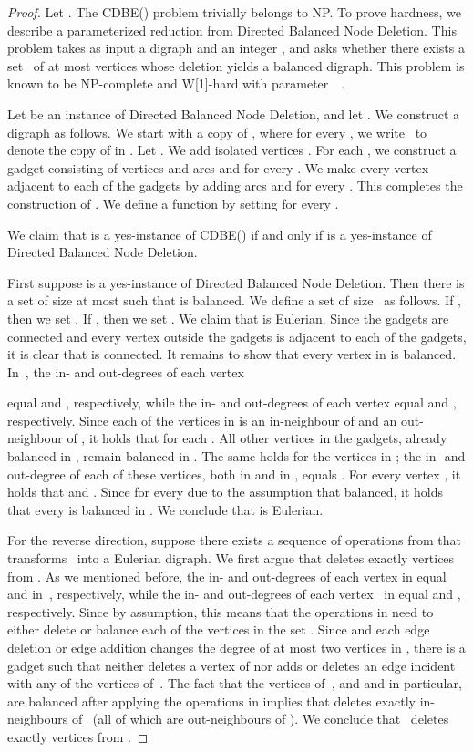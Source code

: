 \documentclass[11pt]{llncs}
\newcommand{\cdbe}{{\sc CDBE}}
\newcommand{\NP}{{\sf NP}}
\newcommand{\W}{{\sf W[1]}}
\begin{document}
\begin{proof}
Let . The \cdbe() problem
trivially belongs to \NP. To prove hardness, we describe a parameterized
reduction from {\sc Directed Balanced Node Deletion}. This problem takes as
input a digraph  and an integer , and asks whether there exists a
set~ of at most  vertices whose deletion yields a balanced digraph. This
problem is known to be \NP-complete and \W-hard with
parameter~~\cite{CyganMPPS14}.  

Let  be an instance of {\sc Directed Balanced Node Deletion}, and let
. We construct a digraph  as follows. We start with a copy of
, where for every , we write~ to denote the copy of  in
. Let . We add  isolated vertices
. 
For each , we construct a gadget  consisting of
vertices  and arcs  and
 for every .  We make every vertex  adjacent to each of the gadgets by adding arcs
 and  for every . This completes the
construction of . We define a function 
by setting  for every .

We claim that  is a yes-instance of \cdbe() if and only if
 is a yes-instance of {\sc Directed Balanced Node Deletion}.

First suppose  is a yes-instance of {\sc Directed Balanced Node
Deletion}. Then there is a set  of size at most  such
that  is balanced. We define a set  of size~ as
follows. If , then we set . If , then we set . We claim that  is Eulerian. Since the gadgets
are connected and every vertex outside the gadgets is adjacent to each of the
gadgets, it is clear that  is connected. It remains to show that every
vertex in  is balanced. In~, the in- and out-degrees of each vertex
 
equal  and , respectively, while the in- and out-degrees of each vertex
 equal  and , respectively.  Since each of the  vertices in
 is an in-neighbour of  and an out-neighbour of , it holds that 
 for
each .  All other vertices in the gadgets, already
balanced in , remain balanced in . The same holds for the vertices
in ; the in- and out-degree of each of these
vertices, both in  and in , equals . For every vertex , it holds that  and
. Since  for
every  due to the assumption that  balanced, it
holds that every  is balanced in . We conclude
that  is Eulerian.

For the reverse direction, suppose there exists a sequence  of operations
from  that transforms~ into a Eulerian digraph. We first argue that 
deletes exactly  vertices from . 
As we mentioned before, the in- and out-degrees of each vertex  in 
equal  and  in~, respectively, while the in- and out-degrees of
each vertex~ in  equal  and , respectively.  Since  by
assumption, this means that the operations in  need to either delete or
balance each of the  vertices in the set
. Since  and each edge
deletion or edge addition changes the degree of at most two vertices in ,
there is a gadget  such that  neither deletes a vertex of  nor
adds or deletes an edge incident with any of the vertices of~. The fact
that the vertices of~, and  and  in particular, are balanced
after applying the operations in  implies that  deletes exactly 
in-neighbours of~ (all of which are out-neighbours of ). We conclude
that~ deletes exactly  vertices from .


\end{proof}
\end{document}
